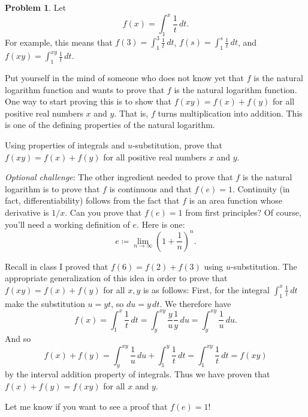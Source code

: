 \documentclass[11pt,oneside]{amsart}
\theoremstyle{definition}
\newtheorem{problem}{Problem}
\begin{document}
    \begin{problem}
        Let
        \[f(x)=\int_1^x\frac 1t\,dt.\]
        For example, this means that $f(3)=\int_1^3\frac 1t\,dt$, $f(s)=\int_1^s\frac 1t\,dt$, and $f(xy)=\int_1^{xy}\frac 1t\,dt$.

        Put yourself in the mind of someone who does not know yet that $f$ is the natural logarithm function and wants to prove that $f$ is the natural logarithm function. One way to start proving this is to show that $f(xy)=f(x)+f(y)$ for all positive real numbers $x$ and $y$. That is, $f$ turns multiplication into addition. This is one of the defining properties of the natural logarithm.
        
        Using properties of integrals and $u$-substitution, prove that $f(xy)=f(x)+f(y)$ for all positive real numbers $x$ and $y$.

        \emph{Optional challenge}: The other ingredient needed to prove that $f$ is the natural logarithm is to prove that $f$ is continuous and that $f(e)=1$. Continuity (in fact, differentiability) follows from the fact that $f$ is an area function whose derivative is $1/x$. Can you prove that $f(e)=1$ from first principles? Of course, you'll need a working definition of $e$. Here is one:
        \[e\coloneqq\lim_{n\to\infty}\left(1+\frac 1n\right)^n.\]
    \end{problem}
    \begin{solution}
        Recall in class I proved that $f(6)=f(2)+f(3)$ using $u$-substitution. The appropriate generalization of this idea in order to prove that $f(xy)=f(x)+f(y)$ for all $x,y$ is as follows: First, for the integral $\int_1^x \frac 1t\,dt$ make the substitution $u=yt$, so $du=y\,dt$. We therefore have
        \[f(x)=\int_1^x \frac 1t\,dt=\int_y^{xy}\frac{y}{u}\frac 1y\,du=\int_y^{xy}\frac 1u\,du.\]
        And so
        \[f(x)+f(y)=\int_y^{xy}\frac 1u\,du+\int_1^y\frac 1t\,dt=\int_1^{xy}\frac 1t\,dt=f(xy)\]
        by the interval addition property of integrals. Thus we have proven that $f(x)+f(y)=f(xy)$ for all $x$ and $y$.

        Let me know if you want to see a proof that $f(e)=1$!
    \end{solution}
\end{document}
